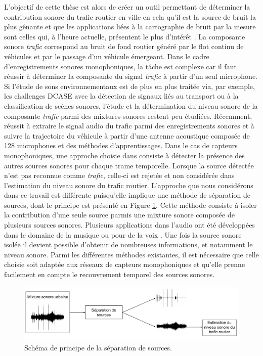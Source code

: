 L'objectif de cette thèse est alors de créer un outil permettant de déterminer la contribution sonore du trafic routier en ville en cela qu'il est la source de bruit la plus gênante et que les applications liées à la cartographie de bruit par la mesure sont celles qui, à l'heure actuelle, présentent le plus d'intérêt \cite{jagniatinskis2014assessment}. La composante sonore  \textit{trafic} correspond au bruit de fond routier généré par le flot continu de véhicules et par le passage d'un véhicule émergeant.
Dans le cadre d'enregistrements sonores monophoniques, la tâche est complexe car il faut réussir à déterminer la composante du signal \textit{trafic} à partir d'un seul microphone. Si l'étude de sons environnementaux est de plus en plus traitée via, par exemple, les challenges DCASE \cite{stowell2015detection,mesaros2017dcase} avec la détection de signaux liés au transport ou à la classification de scènes sonores, l'étude et la détermination du niveau sonore de la composante \textit{trafic} parmi des mixtures sonores restent peu étudiées. Récemment, \cite{leiba2017large} réussit à extraire le signal audio du trafic parmi des enregistrements sonores et à suivre la trajectoire du véhicule à partir d'une antenne acoustique composée de 128 microphones et des méthodes d'apprentissages.
Dans le cas de capteurs monophoniques, une approche choisie dans \cite{socoro2017anomalous} consiste à détecter la présence des autres sources sonores pour chaque trame temporelle. Lorsque la source détectée n'est pas reconnue comme \textit{trafic}, celle-ci est rejetée et non considérée dans l'estimation du niveau sonore du trafic routier.
L'approche que nous considérons dans ce travail est différente puisqu'elle implique une méthode de séparation de sources, dont le principe est présenté en Figure \ref{fig:separation_source_intro}. Cette méthode consiste à isoler la contribution d'une seule source parmis une mixture sonore composée de plusieurs sources sonores. Plusieurs applications dans l'audio ont été développées dans le domaine de la musique \cite{smaragdis_non-negative_2003,virtanen_monaural_2007} ou pour de la voix \cite{weninger2012supervised,yilmaz2004blind}. Une fois la source sonore isolée il devient possible d'obtenir de nombreuses informations, et notamment le niveau sonore. Parmi les différentes méthodes existantes, il est nécessaire que celle choisie soit adaptée aux réseaux de capteurs monophoniques et qu'elle prenne facilement en compte le recouvrement temporel des sources sonores.

\begin{figure}[h]
\centering
\includegraphics[width=\linewidth]{./figures/autres/schema_source_separation_FR.pdf}
\caption{Schéma de principe de la séparation de sources.}
\label{fig:separation_source_intro}
\end{figure}


